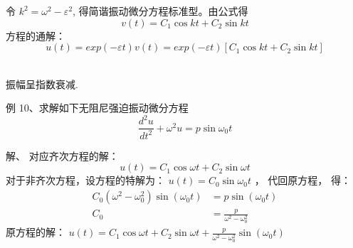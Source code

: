 \begin{frame}	
	令 $k^2 =\omega ^2 - \varepsilon ^2 $, 得简谐振动微分方程标准型。由公式得
	\begin{equation*}
		v(t)=C_1 \cos k t +C_2 \sin k t 
	\end{equation*}
	方程的通解： 
	\begin{equation*}
		u(t)= exp(-\varepsilon t) v(t) =exp(-\varepsilon t) [ C_1 \cos k t +C_2 \sin k t] 
	\end{equation*}	
\end{frame}

\begin{frame}	
	\\
	振幅呈指数衰减.
\end{frame}

\begin{frame}
	\begin{exampleblock} {例 10、求解如下无阻尼强迫振动微分方程}
	\begin{equation*}
		\frac{d^2 u}{d t^2} + \omega ^2 u = p  \sin \omega_0 t 
	\end{equation*}
	\end{exampleblock}
	\alert{解、} 
		对应齐次方程的解：\\
	\begin{equation*}
		u(t)=C_1 \cos \omega t +C_2 \sin \omega t 
	\end{equation*}
	对于非齐次方程，设方程的特解为：
	$ u(t) =C_0 \sin \omega_0 t $ ，
	代回原方程， 得：
	\begin{align*}
		C_0(\omega^2-\omega_{0} ^2 ) \sin(\omega_0 t)& =p\sin(\omega_0 t)\\
		C_0 & = \frac{p}{\omega^2-\omega_{0} ^2 }
	\end{align*}
	原方程的解： $ u(t)= C_1 \cos \omega t +C_2 \sin \omega t+ \frac{p}{\omega^2-\omega_{0} ^2 } \sin (\omega_0 t) $ \\
\end{frame}


